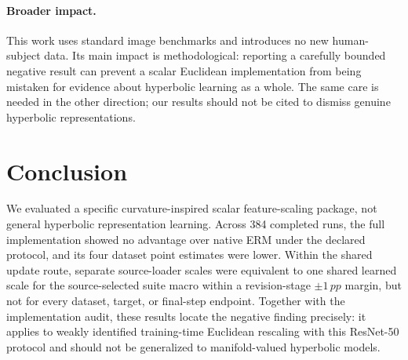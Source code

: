 \documentclass[10pt]{article}
\newcommand{\pp}{\,pp}
\begin{document}
\paragraph{Broader impact.}
This work uses standard image benchmarks and introduces no new human-subject
data. Its main impact is methodological: reporting a carefully bounded
negative result can prevent a scalar Euclidean implementation from being
mistaken for evidence about hyperbolic learning as a whole. The same care is
needed in the other direction; our results should not be cited to dismiss
genuine hyperbolic representations.

\section{Conclusion}

We evaluated a specific curvature-inspired scalar feature-scaling package,
not general hyperbolic representation learning. Across 384 completed runs,
the full implementation showed no advantage over native ERM under the
declared protocol, and its four dataset point estimates were lower. Within the
shared update route, separate source-loader scales were equivalent to one
shared learned scale for the source-selected suite macro within a
revision-stage $\pm1\pp$ margin, but not for every dataset, target, or
final-step endpoint. Together with the implementation audit, these results
locate the negative finding precisely: it applies to weakly identified
training-time Euclidean rescaling with this ResNet-50 protocol and should not
be generalized to manifold-valued hyperbolic models.

\small


\end{document}
